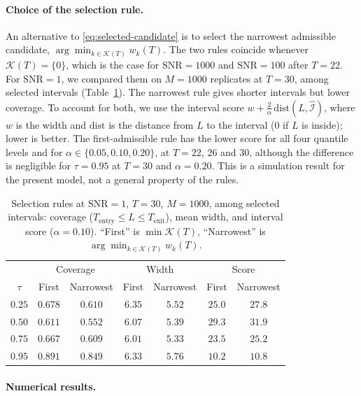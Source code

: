 \documentclass[12pt,a4paper]{article}
\begin{document}
\paragraph{Choice of the selection rule.}
An alternative to \eqref{eq:selected-candidate} is to select the
narrowest admissible candidate,
$\arg\min_{k\in\mathcal K(T)}w_k(T)$. The two rules coincide whenever
$\mathcal K(T)=\{0\}$, which is the case for $\mathrm{SNR}=1000$ and
$\mathrm{SNR}=100$ after $T=22$. For $\mathrm{SNR}=1$, we compared them on
$M=1000$ replicates at $T=30$, among selected intervals
(Table~\ref{tab:rule_comparison}). The narrowest rule gives shorter
intervals but lower coverage. To account for both, we use the interval
score $w+\frac{2}{\alpha}\,\mathrm{dist}(L,\widehat{\mathcal I})$, where
$w$ is the width and $\mathrm{dist}$ is the distance from $L$ to the
interval ($0$ if $L$ is inside); lower is better. The first-admissible
rule has the lower score for all four quantile levels and for
$\alpha\in\{0.05,0.10,0.20\}$, at $T=22$, $26$ and $30$, although the
difference is negligible for $\tau=0.95$ at $T=30$ and $\alpha=0.20$.
This is a simulation result for the present model, not a general
property of the rules.

\begin{table}[htbp]
	\centering
	\caption{Selection rules at $\mathrm{SNR}=1$, $T=30$, $M=1000$,
		among selected intervals: coverage ($T_{\mathrm{entry}}\le L\le
		T_{\mathrm{exit}}$), mean width, and interval score
		($\alpha=0.10$). ``First'' is $\min\mathcal K(T)$, ``Narrowest''
		is $\arg\min_{k\in\mathcal K(T)} w_k(T)$.}
	\label{tab:rule_comparison}
	\begin{tabular}{ccccccc}
		\toprule
		& \multicolumn{2}{c}{Coverage} & \multicolumn{2}{c}{Width}
		& \multicolumn{2}{c}{Score} \\
		$\tau$ & First & Narrowest & First & Narrowest & First & Narrowest \\
		\midrule
		$0.25$ & $0.678$ & $0.610$ & $6.35$ & $5.52$ & $25.0$ & $27.8$ \\
		$0.50$ & $0.611$ & $0.552$ & $6.07$ & $5.39$ & $29.3$ & $31.9$ \\
		$0.75$ & $0.667$ & $0.609$ & $6.01$ & $5.33$ & $23.5$ & $25.2$ \\
		$0.95$ & $0.891$ & $0.849$ & $6.33$ & $5.76$ & $10.2$ & $10.8$ \\
		\bottomrule
	\end{tabular}
\end{table}

\paragraph{Numerical results.}
\end{document}
